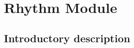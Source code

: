 \newpage
\section{Rhythm Module}

\hypertarget{Concepts:RhythmModule}{}

\hypertarget{Concepts:IPEMMECAnalysis}{}
\hypertarget{Concepts:IPEMMECExtractPatterns}{}
\hypertarget{Concepts:IPEMMECReSynthUI}{}
\hypertarget{Concepts:IPEMMECSynthesis}{}
\hypertarget{Concepts:IPEMMECSaveResults}{}

\label{Concepts:RhythmModule}

\subsection{Introductory description}

